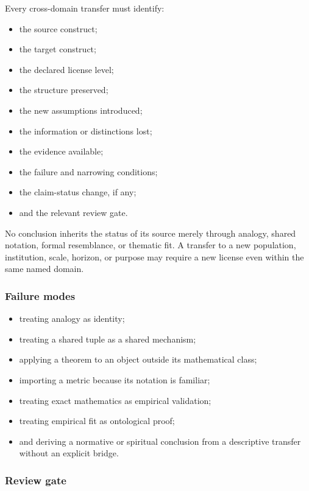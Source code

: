 \documentclass[
  11pt,
]{article}
\providecommand{\tightlist}{%
  \setlength{\itemsep}{0pt}\setlength{\parskip}{0pt}}
\begin{document}
Every cross-domain transfer must identify:

\begin{itemize}
\tightlist
\item
  the source construct;
\item
  the target construct;
\item
  the declared license level;
\item
  the structure preserved;
\item
  the new assumptions introduced;
\item
  the information or distinctions lost;
\item
  the evidence available;
\item
  the failure and narrowing conditions;
\item
  the claim-status change, if any;
\item
  and the relevant review gate.
\end{itemize}

No conclusion inherits the status of its source merely through analogy,
shared notation, formal resemblance, or thematic fit. A transfer to a
new population, institution, scale, horizon, or purpose may require a
new license even within the same named domain.

\subsubsection{Failure modes}\label{failure-modes-9}

\begin{itemize}
\tightlist
\item
  treating analogy as identity;
\item
  treating a shared tuple as a shared mechanism;
\item
  applying a theorem to an object outside its mathematical class;
\item
  importing a metric because its notation is familiar;
\item
  treating exact mathematics as empirical validation;
\item
  treating empirical fit as ontological proof;
\item
  and deriving a normative or spiritual conclusion from a descriptive
  transfer without an explicit bridge.
\end{itemize}

\subsubsection{Review gate}\label{review-gate-1}
\end{document}
